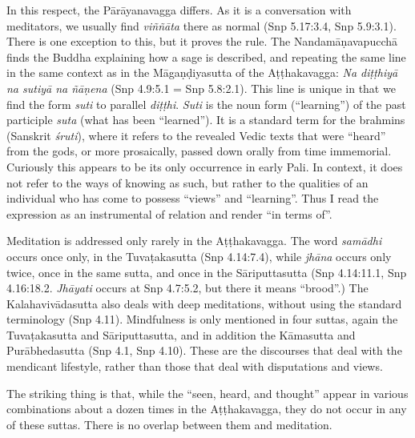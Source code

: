 \documentclass[12pt,openany]{book}%
\begin{document}
In this respect, the \textsanskrit{Pārāyanavagga} differs. As it is a conversation with meditators, we usually find \textit{\textsanskrit{viññāta}} there as normal (Snp 5.17:3.4, Snp 5.9:3.1). There is one exception to this, but it proves the rule. The \textsanskrit{Nandamāṇavapucchā} finds the Buddha explaining how a sage is described, and repeating the same line in the same context as in the \textsanskrit{Māgaṇḍiyasutta} of the \textsanskrit{Aṭṭhakavagga}: \textit{Na \textsanskrit{diṭṭhiyā} na \textsanskrit{sutiyā} na \textsanskrit{ñāṇena}} (Snp 4.9:5.1 = Snp 5.8:2.1). This line is unique in that we find the form \textit{suti} to parallel \textit{\textsanskrit{diṭṭhi}}. \textit{Suti} is the noun form (“learning”) of the past participle \textit{suta} (what has been “learned”). It is a standard term for the brahmins (Sanskrit \textit{\textsanskrit{śruti}}), where it refers to the revealed Vedic texts that were “heard” from the gods, or more prosaically, passed down orally from time immemorial. Curiously this appears to be its only occurrence in early Pali. In context, it does not refer to the ways of knowing as such, but rather to the qualities of an individual who has come to possess “views” and “learning”. Thus I read the expression as an instrumental of relation and render “in terms of”.

Meditation is addressed only rarely in the \textsanskrit{Aṭṭhakavagga}. The word \textit{\textsanskrit{samādhi}} occurs once only, in the \textsanskrit{Tuvaṭakasutta} (Snp 4.14:7.4), while \textit{\textsanskrit{jhāna}} occurs only twice, once in the same sutta, and once in the \textsanskrit{Sāriputtasutta} (Snp 4.14:11.1, Snp 4.16:18.2. \textit{\textsanskrit{Jhāyati}} occurs at Snp 4.7:5.2, but there it means “brood”.) The \textsanskrit{Kalahavivādasutta} also deals with deep meditations, without using the standard terminology (Snp 4.11). Mindfulness is only mentioned in four suttas, again the \textsanskrit{Tuvaṭakasutta} and \textsanskrit{Sāriputtasutta}, and in addition the \textsanskrit{Kāmasutta} and \textsanskrit{Purābhedasutta} (Snp 4.1, Snp 4.10). These are the discourses that deal with the mendicant lifestyle, rather than those that deal with disputations and views.

The striking thing is that, while the “seen, heard, and thought” appear in various combinations about a dozen times in the \textsanskrit{Aṭṭhakavagga}, they do not occur in any of these suttas. There is no overlap between them and meditation.
\end{document}
